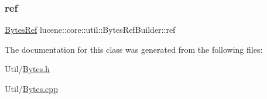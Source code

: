 \subsubsection{\texorpdfstring{ref}{ref}}
{\footnotesize\ttfamily \mbox{\hyperlink{classlucene_1_1core_1_1util_1_1BytesRef}{Bytes\+Ref}} lucene\+::core\+::util\+::\+Bytes\+Ref\+Builder\+::ref\hspace{0.3cm}{\ttfamily [private]}}



The documentation for this class was generated from the following files\+:\begin{DoxyCompactItemize}
\item 
Util/\mbox{\hyperlink{Bytes_8h}{Bytes.\+h}}\item 
Util/\mbox{\hyperlink{Bytes_8cpp}{Bytes.\+cpp}}\end{DoxyCompactItemize}
